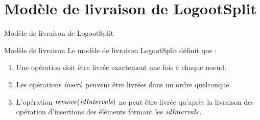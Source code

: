 \section{Modèle de livraison de LogootSplit}

\begin{frame}{Modèle de livraison de LogootSplit}
    \begin{block}{Modèle de livraison}
        Le modèle de livraison LogootSplit définit que :
        \begin{enumerate}
          \item Une opération doit être livrée exactement une fois à chaque noeud.
          \item Les opérations $\mathit{insert}$ peuvent être livrées dans un ordre quelconque.
          \item L'opération $\mathit{remove}(\mathit{idIntervals})$ ne peut être livrée qu'après la livraison des opération d'insertions des éléments formant les $\mathit{idIntervals}$.
        \end{enumerate}
    \end{block}
\end{frame}

